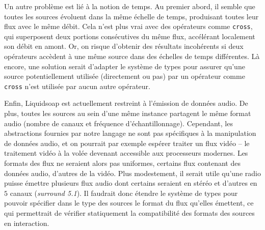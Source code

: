 \documentclass[twoside]{article}
\newcommand{\liquidsoap}{Liquidsoap}
\theoremstyle{plain}
\theoremstyle{definition}
\theoremstyle{remark}
\begin{document}
Un autre problème est lié à la notion de temps.
Au premier abord, il semble que toutes les sources évoluent dans la même 
échelle de temps, produisant toutes leur flux avec le même débit.
Cela n'est plus vrai avec des opérateurs comme \verb.cross.,
qui superposent deux portions consécutives du même flux, accélérant localement 
son débit en amont.
Or, on risque d'obtenir des résultats incohérents si deux opérateurs accèdent à une 
même source dans des échelles de temps différentes.
Là encore, une solution serait d'adapter le système de types
pour assurer qu'une source 
potentiellement utilisée (directement ou pas) par un opérateur comme
\verb.cross. n'est utilisée par aucun autre opérateur.



Enfin, \liquidsoap{} est actuellement restreint à l'émission de données audio.
De plus, toutes les sources au sein d'une même instance partagent le même format
audio (nombre de canaux et fréquence d'échantillonnage). Cependant, les
abstractions fournies par notre langage ne sont pas spécifiques à la manipulation
de données audio, et on pourrait par exemple espérer traiter un flux vidéo -- le
traitement vidéo à la volée devenant accessible aux processeurs modernes. Les
formats des flux ne seraient alors pas uniformes, certains flux contenant des
données audio, d'autres de la vidéo. Plus modestement, il serait utile
qu'une radio puisse émettre plusieurs flux audio dont certains seraient
en stéréo et d'autres en $5$ canaux (\emph{surround 5.1}).
Il faudrait donc étendre le système de types
pour pouvoir spécifier dans le type des sources le format du flux qu'elles
émettent, ce qui permettrait de vérifier statiquement la compatibilité des
formats des sources en interaction.
\end{document}
